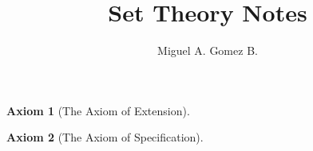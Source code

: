 \documentclass{article}
\title{Set Theory Notes}
\author{Miguel A. Gomez B.}
\newtheorem{axiom}{Axiom}[section]
\begin{document}
	\maketitle
\begin{axiom}[The Axiom of Extension] 	
\end{axiom}
\begin{axiom}[The Axiom of Specification]
\end{axiom}
\end{document}
